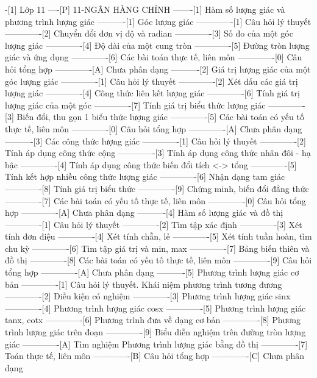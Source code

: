 -[1] Lớp 11
----[P] 11-NGÂN HÀNG CHÍNH
-------[1] Hàm số lượng giác và phương trình lượng giác
----------[1] Góc lượng giác
-------------[1] Câu hỏi lý thuyết
-------------[2] Chuyển đổi đơn vị độ và radian
-------------[3] Số đo của một góc lượng giác
-------------[4] Độ dài của một cung tròn
-------------[5] Đường tròn lượng giác và ứng dụng
-------------[6] Các bài toán thực tế, liên môn
-------------[0] Câu hỏi tổng hợp
-------------[A] Chưa phân dạng
----------[2] Giá trị lượng giác của một góc lượng giác
-------------[1] Câu hỏi lý thuyết
-------------[2] Xét dấu các giá trị lượng giác
-------------[4] Công thức liên kết lượng giác
-------------[6] Tính giá trị lượng giác của một góc
-------------[7] Tính giá trị biểu thức lượng giác
-------------[3] Biến đổi, thu gọn 1 biểu thức lượng giác
-------------[5] Các bài toán có yếu tố thực tế, liên môn
-------------[0] Câu hỏi tổng hợp
-------------[A] Chưa phân dạng
----------[3] Các công thức lượng giác
-------------[1] Câu hỏi lý thuyết
-------------[2] Tính áp dụng công thức cộng
-------------[3] Tính áp dụng công thức nhân đôi - hạ bậc
-------------[4] Tính áp dụng công thức biến đổi tích <-> tổng
-------------[5] Tính kết hợp nhiều công thức lượng giác
-------------[6] Nhận dạng tam giác
-------------[8] Tính giá trị biểu thức
-------------[9] Chứng minh, biến đổi đẳng thức 
-------------[7] Các bài toán có yếu tố thực tế, liên môn
-------------[0] Câu hỏi tổng hợp
-------------[A] Chưa phân dạng
----------[4] Hàm số lượng giác và đồ thị
-------------[1] Câu hỏi lý thuyết
-------------[2] Tìm tập xác định
-------------[3] Xét tính đơn điệu
-------------[4] Xét tính chẵn, lẻ
-------------[5] Xét tính tuần hoàn, tìm chu kỳ
-------------[6] Tìm tập giá trị và min, max
-------------[7] Bảng biến thiên và đồ thị
-------------[8] Các bài toán có yếu tố thực tế, liên môn
-------------[9] Câu hỏi tổng hợp
-------------[A] Chưa phân dạng
----------[5] Phương trình lượng giác cơ bản
-------------[1] Câu hỏi lý thuyết. Khái niệm phương trình tương đương
-------------[2] Điều kiện có nghiệm
-------------[3] Phương trình lượng giác sinx
-------------[4] Phương trình lượng giác cosx
-------------[5] Phương trình lượng giác tanx, cotx
-------------[6] Phương trình đưa về dạng cơ bản
-------------[8] Phương trình lượng giác trên đoạn
-------------[9] Biểu diễn nghiệm trên đường tròn lượng giác
-------------[A] Tìm nghiệm Phương trình lượng giác bằng đồ thị
-------------[7] Toán thực tế, liên môn
-------------[B] Câu hỏi tổng hợp
-------------[C] Chưa phân dạng
